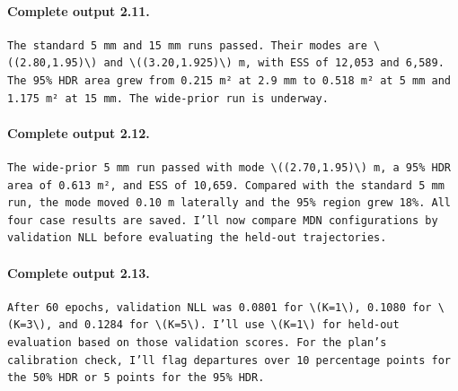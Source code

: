 \documentclass[UTF8,10pt]{ctexart}
\begin{document}
\paragraph{Complete output 2.11.}
\begin{Verbatim}[breaklines=true,breakanywhere=true,fontsize=\scriptsize,frame=single,framesep=2pt]
The standard 5 mm and 15 mm runs passed. Their modes are \((2.80,1.95)\) and \((3.20,1.925)\) m, with ESS of 12,053 and 6,589. The 95% HDR area grew from 0.215 m² at 2.9 mm to 0.518 m² at 5 mm and 1.175 m² at 15 mm. The wide-prior run is underway.
\end{Verbatim}

\paragraph{Complete output 2.12.}
\begin{Verbatim}[breaklines=true,breakanywhere=true,fontsize=\scriptsize,frame=single,framesep=2pt]
The wide-prior 5 mm run passed with mode \((2.70,1.95)\) m, a 95% HDR area of 0.613 m², and ESS of 10,659. Compared with the standard 5 mm run, the mode moved 0.10 m laterally and the 95% region grew 18%. All four case results are saved. I’ll now compare MDN configurations by validation NLL before evaluating the held-out trajectories.
\end{Verbatim}

\paragraph{Complete output 2.13.}
\begin{Verbatim}[breaklines=true,breakanywhere=true,fontsize=\scriptsize,frame=single,framesep=2pt]
After 60 epochs, validation NLL was 0.0801 for \(K=1\), 0.1080 for \(K=3\), and 0.1284 for \(K=5\). I’ll use \(K=1\) for held-out evaluation based on those validation scores. For the plan’s calibration check, I’ll flag departures over 10 percentage points for the 50% HDR or 5 points for the 95% HDR.
\end{Verbatim}
\end{document}
